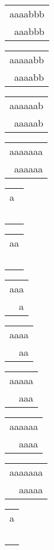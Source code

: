 \begin{description}
\begin{tabular}{|l|}
aaaabbb \\
\ aaabbb \\
\hline
\end{tabular} 
\begin{tabular}{|l|} \hline
aaaaabb \\
\ aaaabb \\
\hline
\end{tabular} 
\begin{tabular}{|l|} \hline
aaaaaab \\
\ aaaaab \\
\hline
\end{tabular} 
\begin{tabular}{|l|} \hline
aaaaaaa \\
\ aaaaaa \\
\hline
\end{tabular} 
\begin{tabular}{|l|} \hline
a\  \\
\ \  \\
\hline
\end{tabular} 
\begin{tabular}{|l|} \hline
aa \\
\ \  \\
\hline
\end{tabular} 
\begin{tabular}{|l|} \hline
aaa \\
\ \ a \\
\hline
\end{tabular} 
\begin{tabular}{|l|} \hline
aaaa \\
\ \ aa \\
\hline
\end{tabular} 
\begin{tabular}{|l|} \hline
aaaaa \\
\ \ aaa \\
\hline
\end{tabular} 
\begin{tabular}{|l|} \hline
aaaaaa \\
\ \ aaaa \\
\hline
\end{tabular} 
\begin{tabular}{|l|} \hline
aaaaaaa \\
\ \ aaaaa \\
\hline
\end{tabular} 
\begin{tabular}{|l|} \hline
a \\
\  \\

\end{tabular}
\end{description}
